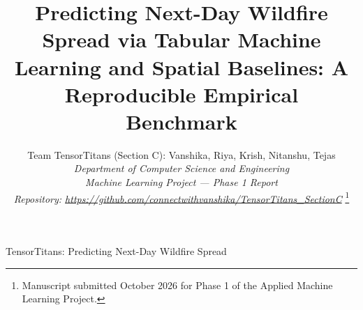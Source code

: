 \documentclass[10pt,journal,compsoc]{IEEEtran}
\begin{document}
\title{Predicting Next-Day Wildfire Spread via Tabular Machine Learning and Spatial Baselines: A Reproducible Empirical Benchmark}

\author{Team TensorTitans (Section C): Vanshika, Riya, Krish, Nitanshu, Tejas\\
\textit{Department of Computer Science and Engineering}\\
\textit{Machine Learning Project --- Phase 1 Report} \\
\textit{Repository: \url{https://github.com/connectwithvanshika/TensorTitans_SectionC}}
\thanks{Manuscript submitted October 2026 for Phase 1 of the Applied Machine Learning Project.}}

%
{TensorTitans: Predicting Next-Day Wildfire Spread}
\end{document}
